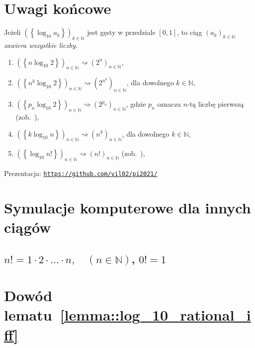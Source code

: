 \documentclass[aspectratio=169]{beamer}
\newcommand{\enumsymbol}{$\triangleright$}
\newcommand{\N}{\mathbb{N}}
\newcommand{\myGithubLink}{https://github.com/vil02/}
\newcommand{\define}[1]{\textcolor{colorOfDefinition}{\textit{#1}}}
\newcommand{\paren}[1]{\!\left(#1 \right)}
\newcommand{\fracpart}[1]{\left\{ #1 \right\}}
\newcommand{\link}[1]{\href{#1}{\texttt{#1}}}
\begin{document}
\section{Uwagi końcowe}
\begin{frame}
  \begin{theorem}
    Jeżeli $\paren{{\fracpart{\log_{10} a_k}}}_{k \in \N}$ jest gęsty w przedziale  $[0, 1]$, to
    ciąg ${\paren{a_k}}_{k \in \N}$ \define{zawiera wszystkie liczby}.
  \end{theorem}
  \pause{}
  \begin{example}
  \begin{enumerate}[label=\enumsymbol]
    \item<+-> $\paren{\fracpart{n\log_{10}2}}_{n \in \N} \rightsquigarrow \paren{2^n}_{n \in \N}$,
    \item<+-> $\paren{\fracpart{n^k\log_{10}2}}_{n \in \N} \rightsquigarrow \paren{2^{n^k}}_{n \in \N}$, dla dowolnego $k \in \N$,
    \item<+-> $\paren{\fracpart{p_n\log_{10}2}}_{n \in \N} \rightsquigarrow \paren{2^{p_n}}_{n \in \N}$, gdzie $p_n$ oznacza $n$-tą liczbę pierwszą (zob.~\cite{Vinogradov1948}),
    \item<+-> $\paren{\fracpart{k\log_{10}n}}_{n \in \N} \rightsquigarrow \paren{n^k}_{n \in \N}$, dla dowolnego $k \in \N$,
    \item<+-> $\paren{\fracpart{\log_{10}n!}}_{n \in \N} \rightsquigarrow\paren{n!}_{n \in \N}$ (zob.~\cite{Diaconis1977}),
  \end{enumerate}
  \end{example}
  \onslide<+-> Prezentacja: \link{\myGithubLink pi2021/}
\end{frame}

\appendix

\section{Symulacje komputerowe dla innych ciągów}

{\powSubstrPlotsTex}

\subsection{\texorpdfstring{$n! = 1\cdot2\cdot \ldots \cdot n, \quad \paren{n \in \N}$, $0! = 1$}{Silnia}} %

{\factorialSubstrPlotsTex}


\section{\texorpdfstring{Dowód lematu~\protect\ref{lemma::log_10_rational_iff}}{Dowód warunku równoważnego wymierności logarytmu dziesiętnego}}
\end{document}
